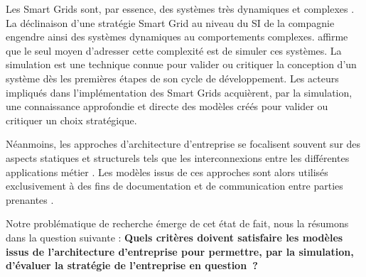 Les Smart Grids sont, par essence, des systèmes très  dynamiques et complexes \cite{monti_power_2010}. La déclinaison d'une stratégie Smart Grid au niveau du SI de la compagnie engendre ainsi des systèmes dynamiques au comportements complexes. \cite{borshchev2004system} affirme que le seul moyen d'adresser cette complexité est  de simuler ces systèmes. La simulation est une technique connue pour valider ou critiquer la conception d'un système dès les premières étapes de son cycle de développement. Les acteurs impliqués dans l'implémentation des Smart Grids acquièrent, par la  simulation, une connaissance approfondie et directe des modèles créés pour valider ou critiquer un choix stratégique.

Néanmoins, les approches d'architecture d'entreprise se focalisent souvent sur des aspects statiques et structurels tels que les interconnexions entre les différentes applications métier \cite{buckl2008towards}. Les modèles issus de ces approches sont alors utilisés exclusivement à des fins de documentation et de communication entre parties prenantes \cite{kulkarni2013modelling}. 

Notre problématique de recherche émerge de cet état de fait, nous la résumons dans la question suivante :
\textbf{Quels critères doivent satisfaire les modèles issus de l'architecture d'entreprise pour permettre, par la simulation, d'évaluer la stratégie de l'entreprise en question~?}
     
